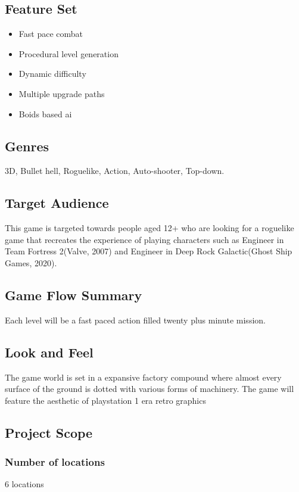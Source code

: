\documentclass{article}
\begin{document}
\subsection{Feature Set}
\label{sec:org8a17784}
\begin{itemize}
\item Fast pace combat
\item Procedural level generation
\item Dynamic difficulty
\item Multiple upgrade paths
\item Boids based ai
\end{itemize}
\subsection{Genres}
\label{sec:org1199312}
3D, Bullet hell, Roguelike, Action, Auto-shooter, Top-down.
\subsection{Target Audience}
\label{sec:org4020dab}

This game is targeted towards people aged 12+ who are looking for a roguelike game that recreates the experience of playing characters such as Engineer in Team Fortress 2(Valve, 2007) and Engineer in Deep Rock Galactic(Ghost Ship Games, 2020).
\subsection{Game Flow Summary}
\label{sec:org9f57405}
Each level will be a fast paced action filled twenty plus minute mission.
\subsection{Look and Feel}
\label{sec:orgf8aa0c5}
The game world is set in a expansive factory compound where almost every surface of the ground is dotted with various forms of machinery.
The game will feature the aesthetic of playstation 1 era retro graphics
\subsection{Project Scope}
\label{sec:orgdd8983e}
\subsubsection{Number of locations}
\label{sec:orgd889448}

6 locations
\end{document}
